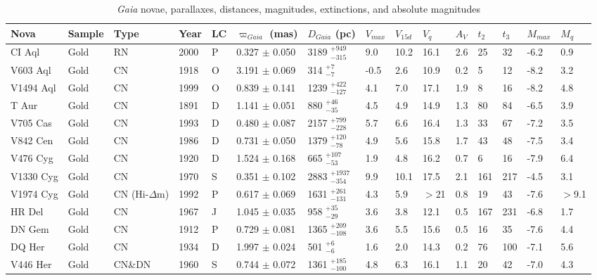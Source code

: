 \documentclass[a4paper,fleqn,usenatbib]{mnras}
\begin{document}
\begin{table*}
	\centering
	\caption{{\it Gaia} novae, parallaxes, distances, magnitudes, extinctions, and absolute magnitudes}
	\begin{tabular}{lllllllllllllll} 
		\hline
		Nova &
		Sample &
		Type &
		Year &
		LC & 
		$\varpi _{Gaia}$ (mas) &
		$D_{Gaia}$ (pc) &
		$V_{max}$ &
		$V_{15d}$ &
		$V_q$ &
		$A_V$ &
		$t_2$ &
		$t_3$ &
		$M_{max}$ &
		$M_q$
		\\
		\hline
CI Aql	&	Gold	&	RN	&	2000	&	P	&	0.327	$\pm$	0.050	&	3189	$_{-	315	}^{+	949	}$ &	9.0	&	10.2	&	16.1	&	2.6	&	25	&	32	&	-6.2	&	0.9	\\
V603 Aql	&	Gold	&	CN	&	1918	&	O	&	3.191	$\pm$	0.069	&	314	$_{-	7	}^{+	7	}$ &	-0.5	&	2.6	&	10.9	&	0.2	&	5	&	12	&	-8.2	&	3.2	\\
V1494 Aql	&	Gold	&	CN	&	1999	&	O	&	0.839	$\pm$	0.141	&	1239	$_{-	127	}^{+	422	}$ &	4.1	&	7.0	&	17.1	&	1.9	&	8	&	16	&	-8.2	&	4.8	\\
T Aur	&	Gold	&	CN	&	1891	&	D	&	1.141	$\pm$	0.051	&	880	$_{-	35	}^{+	46	}$ &	4.5	&	4.9	&	14.9	&	1.3	&	80	&	84	&	-6.5	&	3.9	\\
V705 Cas	&	Gold	&	CN	&	1993	&	D	&	0.480	$\pm$	0.087	&	2157	$_{-	228	}^{+	799	}$ &	5.7	&	6.6	&	16.4	&	1.3	&	33	&	67	&	-7.2	&	3.5	\\
V842 Cen	&	Gold	&	CN	&	1986	&	D	&	0.731	$\pm$	0.050	&	1379	$_{-	78	}^{+	120	}$ &	4.9	&	5.6	&	15.8	&	1.7	&	43	&	48	&	-7.5	&	3.4	\\
V476 Cyg	&	Gold	&	CN	&	1920	&	D	&	1.524	$\pm$	0.168	&	665	$_{-	53	}^{+	107	}$ &	1.9	&	4.8	&	16.2	&	0.7	&	6	&	16	&	-7.9	&	6.4	\\
V1330 Cyg	&	Gold	&	CN	&	1970	&	S	&	0.351	$\pm$	0.102	&	2883	$_{-	354	}^{+	1937	}$ &	9.9	&	10.1	&	17.5	&	2.1	&	161	&	217	&	-4.5	&	3.1	\\
V1974 Cyg	&	Gold	&	CN (Hi-$\Delta$m)	&	1992	&	P	&	0.617	$\pm$	0.069	&	1631	$_{-	131	}^{+	261	}$ &	4.3	&	5.9	&	$>$21	&	0.8	&	19	&	43	&	-7.6	&	$>$9.1	\\
HR Del	&	Gold	&	CN	&	1967	&	J	&	1.045	$\pm$	0.035	&	958	$_{-	29	}^{+	35	}$ &	3.6	&	3.8	&	12.1	&	0.5	&	167	&	231	&	-6.8	&	1.7	\\
DN Gem	&	Gold	&	CN	&	1912	&	P	&	0.729	$\pm$	0.081	&	1365	$_{-	108	}^{+	209	}$ &	3.6	&	5.5	&	15.6	&	0.5	&	16	&	35	&	-7.6	&	4.4	\\
DQ Her	&	Gold	&	CN	&	1934	&	D	&	1.997	$\pm$	0.024	&	501	$_{-	6	}^{+	6	}$ &	1.6	&	2.0	&	14.3	&	0.2	&	76	&	100	&	-7.1	&	5.6	\\
V446 Her	&	Gold	&	CN\&DN	&	1960	&	S	&	0.744	$\pm$	0.072	&	1361	$_{-	100	}^{+	185	}$ &	4.8	&	6.3	&	16.1	&	1.1	&	20	&	42	&	-7.0	&	4.3	\\

\end{tabular}
\end{table*}
\end{document}
